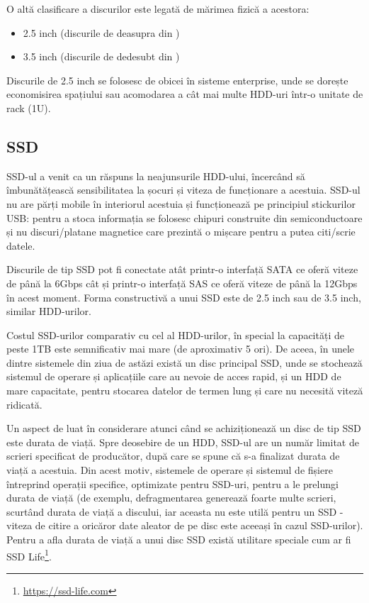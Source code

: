 
O altă clasificare a discurilor este legată de mărimea fizică a acestora:

\begin{itemize}
  \item 2.5 inch (discurile de deasupra din )
  \item 3.5 inch (discurile de dedesubt din )
\end{itemize}

Discurile de 2.5 inch se folosesc de obicei în sisteme enterprise, unde se
dorește economisirea spațiului sau acomodarea a cât mai multe HDD-uri într-o
unitate de rack (1U).

\subsection{SSD}
\label{sec:storage:type:ssd}

SSD-ul a venit ca un răspuns la neajunsurile HDD-ului, încercând să
îmbunătățească sensibilitatea la șocuri și viteza de funcționare a
acestuia. SSD-ul nu are părți mobile în interiorul acestuia și funcționează pe
principiul stickurilor USB: pentru a stoca informația se folosesc chipuri
construite din semiconductoare și nu discuri/platane magnetice care prezintă o
mișcare pentru a putea citi/scrie datele.

Discurile de tip SSD pot fi conectate atât printr-o interfață SATA ce oferă
viteze de până la 6Gbps cât și printr-o interfață SAS ce oferă viteze de până la
12Gbps în acest moment. Forma constructivă a unui SSD este de 2.5 inch sau
de 3.5 inch, similar HDD-urilor.

Costul SSD-urilor comparativ cu cel al HDD-urilor, în special la capacități de
peste 1TB este semnificativ mai mare (de aproximativ 5 ori). De aceea, în
unele dintre sistemele din ziua de astăzi există un disc principal SSD, unde se stochează
sistemul de operare și aplicațiile care au nevoie de acces rapid, și un
HDD de mare capacitate, pentru stocarea datelor de termen lung și care nu
necesită viteză ridicată.

Un aspect de luat în considerare atunci când se achiziționează un disc de tip SSD
este durata de viață. Spre deosebire de un HDD, SSD-ul are un număr limitat de
scrieri specificat de producător, după care se spune că s-a finalizat durata de
viață a acestuia. Din acest motiv, sistemele de operare și sistemul de fișiere
întreprind operații specifice, optimizate pentru SSD-uri, pentru a
le prelungi durata de viață (de exemplu, defragmentarea generează foarte multe
scrieri, scurtând durata de viață a discului, iar aceasta nu este utilă pentru
un SSD - viteza de citire a oricăror date aleator de pe disc este aceeași în
cazul SSD-urilor). Pentru a afla durata de viață a unui disc SSD există utilitare
speciale cum ar fi SSD Life\footnote{\url{https://ssd-life.com}}.

